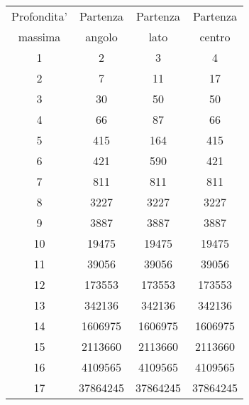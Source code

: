 \begin{tabular}{|c|c|c|c|}
\hline
Profondita' & Partenza & Partenza & Partenza \\
 massima & angolo & lato & centro \\
\hline
         1 &          2 &          3 &          4 \\

         2 &          7 &         11 &         17 \\

         3 &         30 &         50 &         50 \\

         4 &         66 &         87 &         66 \\

         5 &        415 &        164 &        415 \\

         6 &        421 &        590 &        421 \\

         7 &        811 &        811 &        811 \\

         8 &       3227 &       3227 &       3227 \\

         9 &       3887 &       3887 &       3887 \\

        10 &      19475 &      19475 &      19475 \\

        11 &      39056 &      39056 &      39056 \\

        12 &     173553 &     173553 &     173553 \\

        13 &     342136 &     342136 &     342136 \\

        14 &    1606975 &    1606975 &    1606975 \\

        15 &    2113660 &    2113660 &    2113660 \\

        16 &    4109565 &    4109565 &    4109565 \\

        17 &   37864245 &   37864245 &   37864245 \\
\hline
\end{tabular}  

